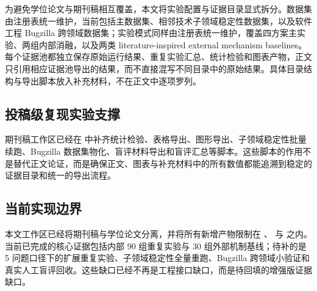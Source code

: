 为避免学位论文与期刊稿相互覆盖，本文将实验配置与证据目录显式拆分。数据集由注册表统一维护，当前包括主数据集、相邻技术子领域稳定性数据集，以及软件工程 Bugzilla 跨领域数据集；实验模式同样由注册表统一维护，覆盖四方案主实验、两组内部消融，以及两类 literature-inspired external mechanism baselines。每个证据池都独立保存原始运行结果、重复实验汇总、统计检验和图表产物，正文只引用相应证据池导出的结果，而不直接混写不同目录中的原始结果。具体目录结构与导出脚本放入补充材料，不在正文中逐项罗列。

\subsection{投稿级复现实验支撑}

期刊稿工作区已经在 \texttt{} 中补齐统计检验、表格导出、图形导出、子领域稳定性批量续跑、Bugzilla 数据集物化、盲评材料导出和盲评汇总等脚本。这些脚本的作用不是替代正文论证，而是确保正文、图表与补充材料中的所有数值都能追溯到稳定的证据目录和统一的导出流程。

\subsection{当前实现边界}

本文工作区已经将期刊稿与学位论文分离，并将所有新增产物限制在 \texttt{}、\texttt{} 与 \texttt{} 之内。当前已完成的核心证据包括内部 90 组重复实验与 30 组外部机制基线；待补的是 5 问题口径下的扩展重复实验、子领域稳定性全量重跑、Bugzilla 跨领域小验证和真实人工盲评回收。这些缺口已经不再是工程接口缺口，而是待回填的增强版证据缺口。
